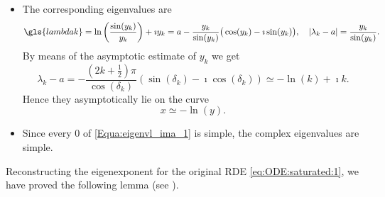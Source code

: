 \documentclass[reqno]{amsart}
\theoremstyle{definition} \newtheorem{definition}{Definition}[section]
\theoremstyle{definition} \newtheorem{remark}[definition]{Remark}
\theoremstyle{plain} \newtheorem{lemma}[definition]{Lemma}
\theoremstyle{plain} \newtheorem{proposition}[definition]{Proposition}
\theoremstyle{plain} \newtheorem{theorem}[definition]{Theorem}
\theoremstyle{plain} \newtheorem{corollary}[definition]{Corollary}
\theoremstyle{definition} \newtheorem{example}[definition]{Example}
\theoremstyle{plain} \newtheorem{claim}[clai]{Claim}
\theoremstyle{definition} \newtheorem{assumption}[definition]{Assumption}
\theoremstyle{definition} \newtheorem{observation}[definition]{Observation}
\newcommand{\1}{\mathbbm 1}
\renewcommand{\i}{\imath}
\numberwithin{equation}{section} %
\theoremstyle{plain} \newtheorem*{theorem*}{Theorem}
\theoremstyle{plain} \newtheorem{mthm}[maintheorem]{Main Theorem}
\theoremstyle{plain} \newtheorem*{mthm*}{Main Theorem}
\theoremstyle{plain} \newtheorem*{conjecture*}{Conjecture}
\theoremstyle{plain} \newtheorem{conjecture}[definition]{Conjecture}
\theoremstyle{plain} \newtheorem*{problem*}{Problem}
\begin{document}
\begin{itemize}
\item The corresponding eigenvalues are 
\begin{equation*}
\gls{lambdak} = \ln \bigg( \frac{\sin(y_k)}{y_k} \bigg) + \i y_k = a - \frac{y_k}{\sin(y_k)} \big( \cos(y_k) - \i \sin(y_k) \big), \quad |\lambda_k - a| = \frac{y_k}{\sin(y_k)}.
\end{equation*}
By means of the asymptotic estimate of $y_k$ we get
\begin{equation*}
\lambda_k - a = - \frac{(2 k + \frac{1}{2}) \pi}{\cos(\delta_k)} (\sin(\delta_k) - \i \cos(\delta_k)) \simeq - \ln(k) + \i k.
\end{equation*}
Hence they asymptotically lie on the curve
\begin{equation*}
x \simeq - \ln(y).
\end{equation*}

\item Since every $0$ of \eqref{Equa:eigenvl_ima_1} is simple, the complex eigenvalues are simple. %
\end{itemize}

Reconstructing the eigenexponent for the original RDE \eqref{eq:ODE:saturated:1}, we have proved the following lemma (see \cite[Lemma 6]{firefighter}).
\end{document}
